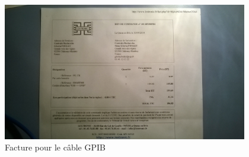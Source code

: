 \label{annexe_factures}

\begin{figure}[hb]
  \begin{center}
		\includegraphics[height=6cm]{./images/facture.jpg}
		\caption{Facture pour le c\^able GPIB}
		\label{facture}
	\end{center}
\end{figure}